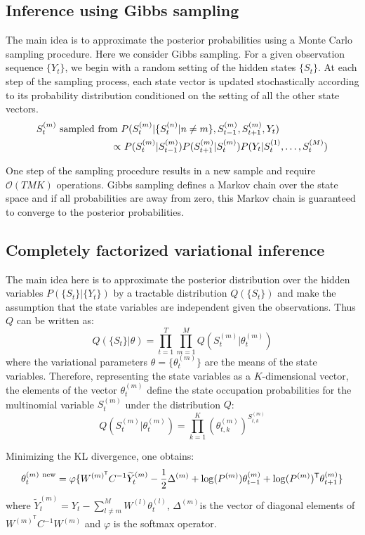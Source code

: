 \documentclass{article}
\begin{document}
\subsection{Inference using Gibbs sampling}

The main idea is to approximate the posterior probabilities using a Monte Carlo sampling procedure. Here we consider Gibbs sampling. For a given observation sequence $\{Y_t\}$, we begin with a random setting of the hidden states $\{S_t\}$. At each step of the sampling process, each state vector is updated stochastically according to its probability distribution conditioned on the setting of all the other state vectors.
\begin{align*}
S_t^{(m)} \textnormal{ sampled from } & P(S_t^{(m)} | \{S_t^{(n)} | n \ne m \}, S_{t-1}^{(m)}, S_{t+1}^{(m)}, Y_t) \\
\propto & \ P(S_t^{(m)} | S_{t-1}^{(m)}) P(S_{t+1}^{(m)} | S_{t}^{(m)}) P(Y_t | S_{t}^{(1)}, \dots, S_{t}^{(M)})
\end{align*}

One step of the sampling procedure results in a new sample and require $\mathcal{O}(TMK)$ operations. Gibbs sampling defines a Markov chain over the state space and if all probabilities are away from zero, this Markov chain is guaranteed to converge to the posterior probabilities.

\subsection{Completely factorized variational inference}

The main idea here is to approximate the posterior distribution over the hidden variables $P(\{S_t\}|\{Y_t\})$ by a tractable distribution $Q(\{S_t\})$ and make the assumption that the state variables are independent given the observations. Thus $Q$ can be written as:
\[ Q(\{S_t\}|\theta) = \prod_{t=1}^T \prod_{m=1}^M Q(S_t^{(m)}|\theta_t^{(m)}) \]
where the variational parameters $\theta = \{ \theta_t^{(m)} \}$ are the means of the state variables. Therefore, representing the state variables as a $K$-dimensional vector, the elements of the vector $\theta_t^{(m)}$ define the state occupation probabilities for the multinomial variable $S_t^{(m)}$ under the distribution $Q$:
\[ Q(S_t^{(m)}|\theta_t^{(m)}) = \prod_{k=1}^K \left( \theta_{t,k}^{(m)} \right)^{S_{t,k}^{(m)}} \]

Minimizing the KL divergence, one obtains:
\begin{equation}
\theta_t^{(m) \ \textnormal{new}} = \varphi\{ W^{(m)^\mathsf{T}} C^{-1} \widetilde{Y}_t^{(m)} - \frac{1}{2} \Delta^{(m)} + \log(P^{(m)}) \theta_{t-1}^{(m)} + \log(P^{(m)})^\mathsf{T} \theta_{t+1}^{(m)} \}
\label{eq2}
\end{equation}
where $\widetilde{Y}_t^{(m)} = Y_t - \sum_{l \ne m}^M W^{(l)} \theta_t^{(l)}$, $\Delta^{(m)}$is the vector of diagonal elements of $W^{(m)^\mathsf{T}} C^{-1} W^{(m)}$ and $\varphi$ is the softmax operator.
\end{document}
